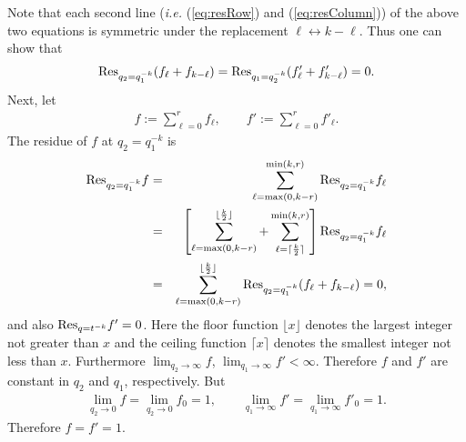 \documentclass[hyper,letterpaper]{JHEP3}
\begin{document}
Note that each second line
(\emph{i.e.} (\ref{eq:resRow}) and (\ref{eq:resColumn}))
of the above two equations
is symmetric under the replacement $\ell \leftrightarrow k-\ell$.
Thus one can show that
\begin{eqnarray}
{\rm Res}_{q_2=q_1^{-k}} ( f_\ell + f_{k-\ell} )
=
{\rm Res}_{q_1=q_2^{-k}} ( f'_\ell + f'_{k-\ell} )
=0.
\end{eqnarray}
%
%
Next, let
\begin{eqnarray}
f:=\sum_{\ell=0}^{r} f_\ell
,
\qquad
f':=\sum_{\ell=0}^{r} f'_\ell
.
\end{eqnarray}
The residue of $f$ at $q_2=q_1^{-k}$ is
\begin{eqnarray}
{\rm Res}_{q_2=q_1^{-k}} f
&=&
\sum_{\ell={\rm max}(0,k-r)}^{{\rm min}(k,r)}
{\rm Res}_{q_2=q_1^{-k}} f_\ell
\nonumber \\
&=&
\left[
\sum_{\ell={\rm max}(0,k-r)}^{\lfloor\frac{k}{2}\rfloor}
+
\sum_{\ell=\lceil\frac{k}{2}\rceil}^{{\rm min}(k,r)}
\right]
{\rm Res}_{q_2=q_1^{-k}} f_\ell
\nonumber \\
&=&
\sum_{\ell={\rm max}(0,k-r)}^{\lfloor\frac{k}{2}\rfloor}
{\rm Res}_{q_2=q_1^{-k}} ( f_\ell + f_{k-\ell} )
=0,
\end{eqnarray}
and also
${\rm Res}_{q=t^{-k}} f' = 0 $.
Here the floor function $\lfloor x\rfloor$
denotes the largest integer not greater than $x$
and the ceiling function $\lceil x\rceil$
denotes the smallest integer not less than $x$.
Furthermore
$\lim_{q_2\rightarrow\infty}f$,
$\lim_{q_1\rightarrow\infty}f'<\infty$.
Therefore
$f$ and $f'$ are constant in $q_2$ and $q_1$, respectively.
But
\begin{eqnarray}
\lim_{q_2\rightarrow 0} f
=
\lim_{q_2\rightarrow 0} f_0
=1
,
\qquad
\lim_{q_1\rightarrow \infty} f'
=
\lim_{q_1\rightarrow \infty} f'_0
=1
.
\end{eqnarray}
Therefore $f=f'=1$.
\hfill\fbox{}








\end{document}
